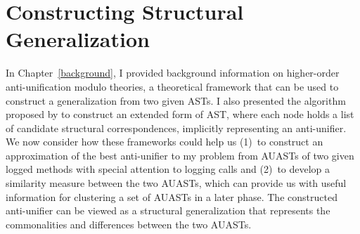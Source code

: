 \chapter{Constructing Structural Generalization} \label{ch4} \label{methodology}




In Chapter~\ref{background}, I provided background information on higher-order anti-unification modulo theories, a theoretical framework that can be used to construct a generalization from two given ASTs. I also presented the algorithm proposed by \citet{2008:fse:cottrell} to construct an extended form of AST, where each node holds a list of candidate structural correspondences, implicitly representing an anti-unifier. We now consider how these frameworks could help us (1)~to construct an approximation of the best anti-unifier to my problem from AUASTs of two given logged methods with special attention to logging calls and (2)~to develop a similarity measure between the two AUASTs, which can provide us with useful information for clustering a set of AUASTs in a later phase. The constructed anti-unifier can be viewed as a structural generalization that represents the commonalities and differences between the two AUASTs. 




